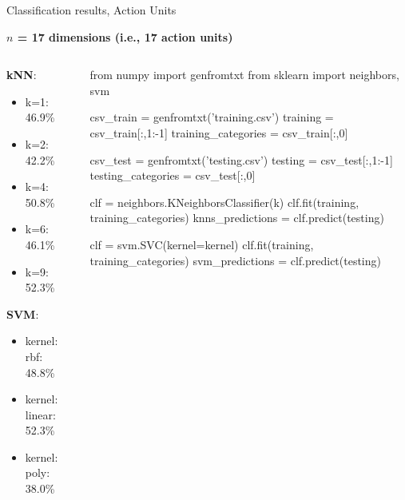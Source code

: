 \documentclass[compress]{beamer}
\begin{document}
\begin{frame}[fragile]{Classification results, Action Units}
    

    \begin{center}
        {\bf $n$ = 17 dimensions (i.e., 17 action units)}
    \end{center}

    \begin{columns}
        \begin{column}{0.4\linewidth}
    {\bf kNN}:
    \begin{itemize}
        \item k=1: 46.9\%
        \item k=2: 42.2\%
        \item k=4: 50.8\%
        \item k=6: 46.1\%
        \item k=9: 52.3\%
    \end{itemize}

    {\bf SVM}:

    \begin{itemize}
        \item kernel: rbf: 48.8\%
        \item kernel: linear: 52.3\%
        \item kernel: poly: 38.0\%
    \end{itemize}


        \end{column}
        \begin{column}{0.6\linewidth}
            \begin{pythoncode}
from numpy import genfromtxt
from sklearn import neighbors, svm

csv_train = genfromtxt('training.csv')
training = csv_train[:,1:-1]
training_categories = csv_train[:,0]

csv_test = genfromtxt('testing.csv')
testing = csv_test[:,1:-1]
testing_categories = csv_test[:,0]

clf = neighbors.KNeighborsClassifier(k)
clf.fit(training, training_categories)
knns_predictions = clf.predict(testing)

clf = svm.SVC(kernel=kernel)
clf.fit(training, training_categories)
svm_predictions = clf.predict(testing)

            \end{pythoncode}
        \end{column}
    \end{columns}

\end{frame}
\end{document}
